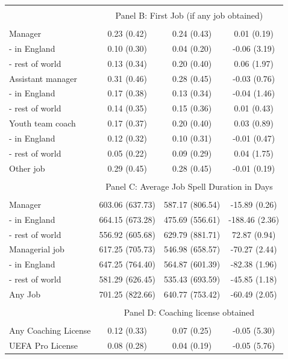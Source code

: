 \begin{table}[!ht]
{\begin{threeparttable}
\begin{tabular}{lccc}
\hline
\\[-1.8ex] 
& \multicolumn{3}{c}{Panel B: First Job (if any job obtained)}\\
\hline
\\[-1.8ex] 
Manager & 0.23 (0.42) & 0.24 (0.43) & 0.01 (0.19) \\ 
  - in England & 0.10 (0.30) & 0.04 (0.20) & -0.06 (3.19) \\ 
  - rest of world & 0.13 (0.34) & 0.20 (0.40) & 0.06 (1.97) \\ [1.8ex]
Assistant manager & 0.31 (0.46) & 0.28 (0.45) & -0.03 (0.76) \\ 
  - in England & 0.17 (0.38) & 0.13 (0.34) & -0.04 (1.46) \\ 
  - rest of world & 0.14 (0.35) & 0.15 (0.36) & 0.01 (0.43) \\ [1.8ex]
Youth team coach & 0.17 (0.37) & 0.20 (0.40) & 0.03 (0.89) \\ 
  - in England & 0.12 (0.32) & 0.10 (0.31) & -0.01 (0.47) \\ 
  - rest of world & 0.05 (0.22) & 0.09 (0.29) & 0.04 (1.75) \\ [1.8ex]
Other job & 0.29 (0.45) & 0.28 (0.45) & -0.01 (0.19) \\ 
\hline
\\[-1.8ex] 
& \multicolumn{3}{c}{Panel C: Average Job Spell Duration in Days}\\
\hline
\\[-1.8ex] 
Manager & 603.06 (637.73) & 587.17 (806.54) & -15.89 (0.26) \\ 
  - in England & 664.15 (673.28) & 475.69 (556.61) & -188.46 (2.36) \\ 
  - rest of world & 556.92 (605.68) & 629.79 (881.71) & 72.87 (0.94) \\ [1.8ex]
  Managerial job & 617.25 (705.73) & 546.98 (658.57) & -70.27 (2.44) \\ 
  - in England & 647.25 (764.40) & 564.87 (601.39) & -82.38 (1.96) \\ 
  - rest of world & 581.29 (626.45) & 535.43 (693.59) & -45.85 (1.18) \\ [1.8ex]
  Any Job & 701.25 (822.66) & 640.77 (753.42) & -60.49 (2.05) \\ 
\hline
\\[-1.8ex] 
& \multicolumn{3}{c}{Panel D: Coaching license obtained}\\
\hline
\\[-1.8ex] 
Any Coaching License & 0.12 (0.33) & 0.07 (0.25) & -0.05 (5.30) \\ 
UEFA Pro License & 0.08 (0.28) & 0.04 (0.19) & -0.05 (5.76) \\ 

\end{tabular}
\end{threeparttable}}
\end{table}
